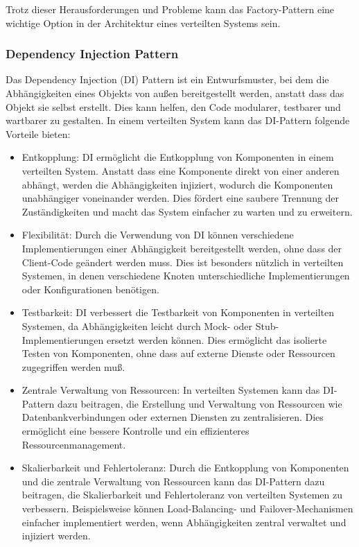 Trotz dieser Herausforderungen und Probleme kann das Factory-Pattern eine wichtige Option in der Architektur eines verteilten Systems sein. 

\subsubsection{Dependency Injection Pattern}

Das Dependency Injection (DI) Pattern ist ein Entwurfsmuster, bei dem die Abhängigkeiten eines Objekts von außen bereitgestellt werden, anstatt dass das Objekt sie selbst erstellt. Dies kann helfen, den Code modularer, testbarer und wartbarer zu gestalten. In einem verteilten System kann das DI-Pattern folgende Vorteile bieten:
\begin{itemize}
\item Entkopplung: DI ermöglicht die Entkopplung von Komponenten in einem verteilten System. Anstatt dass eine Komponente direkt von einer anderen abhängt, werden die Abhängigkeiten injiziert, wodurch die Komponenten unabhängiger voneinander werden. Dies fördert eine saubere Trennung der Zuständigkeiten und macht das System einfacher zu warten und zu erweitern.
\item Flexibilität: Durch die Verwendung von DI können verschiedene Implementierungen einer Abhängigkeit bereitgestellt werden, ohne dass der Client-Code geändert werden muss. Dies ist besonders nützlich in verteilten Systemen, in denen verschiedene Knoten unterschiedliche Implementierungen oder Konfigurationen benötigen.
\item Testbarkeit: DI verbessert die Testbarkeit von Komponenten in verteilten Systemen, da Abhängigkeiten leicht durch Mock- oder Stub-Implementierungen ersetzt werden können. Dies ermöglicht das isolierte Testen von Komponenten, ohne dass auf externe Dienste oder Ressourcen zugegriffen werden muß.
\item Zentrale Verwaltung von Ressourcen: In verteilten Systemen kann das DI-Pattern dazu beitragen, die Erstellung und Verwaltung von Ressourcen wie Datenbankverbindungen oder externen Diensten zu zentralisieren. Dies ermöglicht eine bessere Kontrolle und ein effizienteres Ressourcenmanagement.
\item Skalierbarkeit und Fehlertoleranz: Durch die Entkopplung von Komponenten und die zentrale Verwaltung von Ressourcen kann das DI-Pattern dazu beitragen, die Skalierbarkeit und Fehlertoleranz von verteilten Systemen zu verbessern. Beispielsweise können Load-Balancing- und Failover-Mechanismen einfacher implementiert werden, wenn Abhängigkeiten zentral verwaltet und injiziert werden.
\end{itemize}

